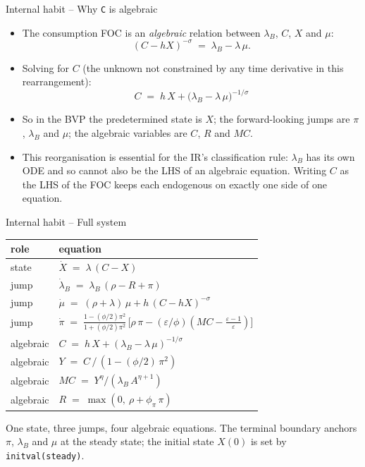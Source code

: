 \documentclass[11pt,aspectratio=169]{beamer}
\begin{document}
\begin{frame}{Internal habit -- Why \texttt{C} is algebraic}

\begin{itemize}

\item The consumption FOC is an \emph{algebraic} relation between
  $\lambda_B$, $C$, $X$ and $\mu$:
  \[
  (C - hX)^{-\sigma} \;=\; \lambda_B - \lambda\,\mu.
  \]

\item Solving for $C$ (the unknown not constrained by any time
  derivative in this rearrangement):
  \[
  \boxed{C \;=\; h\,X + \bigl(\lambda_B - \lambda\,\mu\bigr)^{-1/\sigma}}
  \]

\item So in the BVP the predetermined state is $X$; the forward-looking
  jumps are $\pi$, $\lambda_B$ and $\mu$; the algebraic variables are
  $C$, $R$ and $MC$.\newline

\item This reorganisation is essential for the IR's classification rule:
  $\lambda_B$ has its own ODE and so cannot also be the LHS of an
  algebraic equation. Writing $C$ as the LHS of the FOC keeps each
  endogenous on exactly one side of one equation.

\end{itemize}

\end{frame}

\begin{frame}{Internal habit -- Full system}

\begin{center}
\small
\renewcommand{\arraystretch}{1.35}
\begin{tabular}{ll}
\toprule
role & equation \\
\midrule
state      & $\dot X \;=\; \lambda\,(C - X)$ \\
jump       & $\dot\lambda_B \;=\; \lambda_B\,(\rho - R + \pi)$ \\
jump       & $\dot\mu \;=\; (\rho + \lambda)\,\mu + h\,(C - hX)^{-\sigma}$ \\
jump       & $\dot\pi \;=\; \frac{1-(\phi/2)\pi^2}{1+(\phi/2)\pi^2}\,
              \bigl[\rho\,\pi - (\varepsilon/\phi)(MC - \tfrac{\varepsilon-1}{\varepsilon})\bigr]$ \\
algebraic  & $C \;=\; h\,X + (\lambda_B - \lambda\,\mu)^{-1/\sigma}$ \\
algebraic  & $Y \;=\; C\,/\,(1 - (\phi/2)\,\pi^2)$ \\
algebraic  & $MC \;=\; Y^\eta / (\lambda_B\,A^{\eta+1})$ \\
algebraic  & $R \;=\; \max(0,\ \rho + \phi_\pi\,\pi)$ \\
\bottomrule
\end{tabular}
\end{center}

\medskip

One state, three jumps, four algebraic equations. The terminal
boundary anchors $\pi$, $\lambda_B$ and $\mu$ at the steady state; the
initial state $X(0)$ is set by \texttt{initval(steady)}.

\end{frame}
\end{document}
